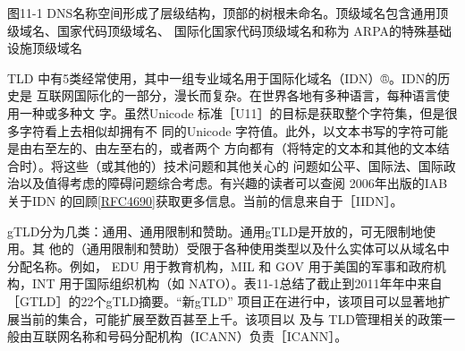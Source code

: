 图11-1
DNS名称空间形成了层级结构，顶部的树根未命名。顶级域名包含通用顶级域名、国家代码顶级域名、
国际化国家代码顶级域名和称为 ARPA的特殊基础设施顶级域名

TLD 中有5类经常使用，其中一组专业域名用于国际化域名（IDN）®。IDN的历史是
互联网国际化的一部分，漫长而复杂。在世界各地有多种语言，每种语言使用一种或多种文
字。虽然Unicode 标准［U11］的目标是获取整个字符集，但是很多字符看上去相似却拥有不
同的Unicode 字符值。此外，以文本书写的字符可能是由右至左的、由左至右的，或者两个
方向都有（将特定的文本和其他的文本结合时）。将这些（或其他的）技术问题和其他关心的
问题如公平、国际法、国际政治以及值得考虑的障碍问题综合考虑。有兴趣的读者可以查阅
2006年出版的IAB关于IDN 的回顾\href{https://www.rfc-editor.org/rfc/rfc4690}{[RFC4690]}获取更多信息。当前的信息来自于［IIDN］。

gTLD分为几类：通用、通用限制和赞助。通用gTLD是开放的，可无限制地使用。其
他的（通用限制和赞助）受限于各种使用类型以及什么实体可以从域名中分配名称。例如，
EDU 用于教育机构，MIL 和 GOV 用于美国的军事和政府机构，INT 用于国际组织机构（如
NATO）。表11-1总结了截止到2011年年中来自［GTLD］的22个gTLD摘要。“新gTLD”
项目正在进行中，该项目可以显著地扩展当前的集合，可能扩展至数百甚至上千。该项目以
及与 TLD管理相关的政策一般由互联网名称和号码分配机构（ICANN）负责［ICANN］。

